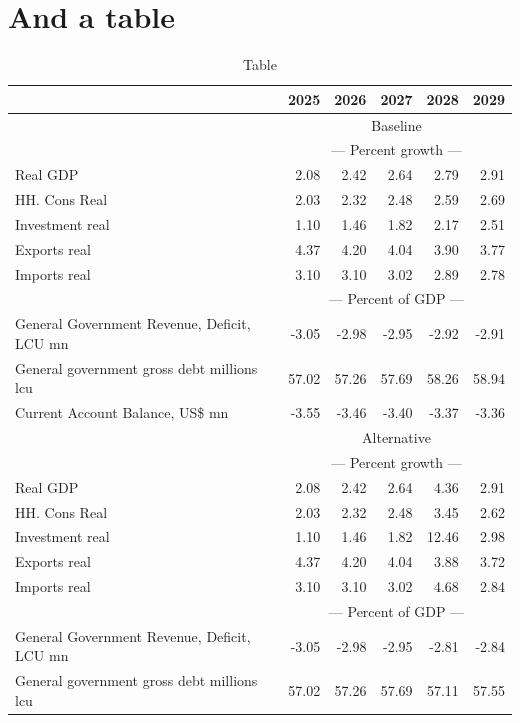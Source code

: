 \documentclass{article}
\begin{document}
 \section{And a table}
\begin{table}[ht]
\caption{Table}
\begin{tabular}{lrrrrr}
\toprule
 & 2025 & 2026 & 2027 & 2028 & 2029 \\
\midrule
&\multicolumn{5}{c}{{Baseline}}                          \\
&\multicolumn{5}{c}{{--- Percent growth ---}}                          \\
Real GDP & 2.08 & 2.42 & 2.64 & 2.79 & 2.91 \\
HH. Cons Real & 2.03 & 2.32 & 2.48 & 2.59 & 2.69 \\
Investment real & 1.10 & 1.46 & 1.82 & 2.17 & 2.51 \\
Exports real & 4.37 & 4.20 & 4.04 & 3.90 & 3.77 \\
Imports real & 3.10 & 3.10 & 3.02 & 2.89 & 2.78 \\
&\multicolumn{5}{c}{{--- Percent of GDP ---}}                          \\
General Government Revenue, Deficit, LCU mn & -3.05 & -2.98 & -2.95 & -2.92 & -2.91 \\
General government gross debt millions lcu & 57.02 & 57.26 & 57.69 & 58.26 & 58.94 \\
Current Account Balance, US\$ mn & -3.55 & -3.46 & -3.40 & -3.37 & -3.36 \\
&\multicolumn{5}{c}{{Alternative}}                          \\
&\multicolumn{5}{c}{{--- Percent growth ---}}                          \\
Real GDP & 2.08 & 2.42 & 2.64 & 4.36 & 2.91 \\
HH. Cons Real & 2.03 & 2.32 & 2.48 & 3.45 & 2.62 \\
Investment real & 1.10 & 1.46 & 1.82 & 12.46 & 2.98 \\
Exports real & 4.37 & 4.20 & 4.04 & 3.88 & 3.72 \\
Imports real & 3.10 & 3.10 & 3.02 & 4.68 & 2.84 \\
&\multicolumn{5}{c}{{--- Percent of GDP ---}}                          \\
General Government Revenue, Deficit, LCU mn & -3.05 & -2.98 & -2.95 & -2.81 & -2.84 \\
General government gross debt millions lcu & 57.02 & 57.26 & 57.69 & 57.11 & 57.55 \\

\end{tabular}
\end{table}
\end{document}
